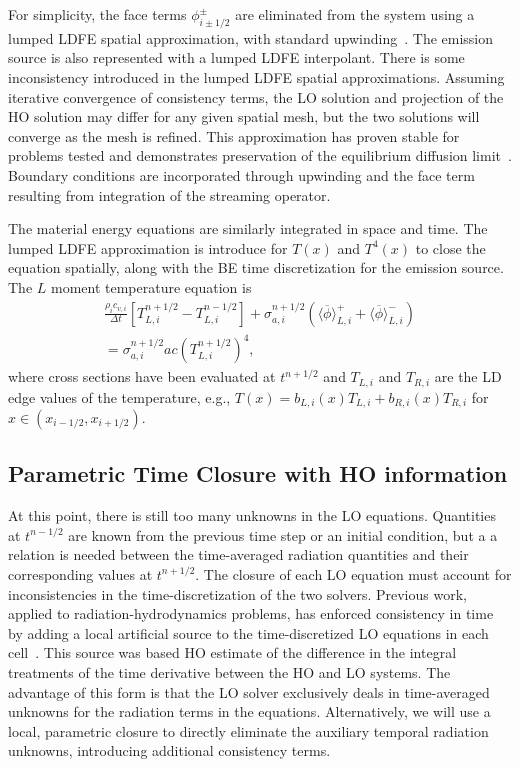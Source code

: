 \documentclass{anstrans}
\newcommand{\mom}[1]{\langle #1 \rangle}
\newcommand{\xl}{{x_{i-1/2}}}
\newcommand{\xr}{{x_{i+1/2}}}
\newcommand{\phibar}{\ensuremath{\overline{\phi}}}
\begin{document}
For simplicity, the face terms $\phi_{i\pm1/2}^\pm$ are eliminated from the
system using a lumped LDFE spatial approximation, with standard upwinding~\cite{bolding_nse}.  The
emission source is also represented with a lumped LDFE interpolant. 
There is some inconsistency introduced in the lumped LDFE spatial approximations. Assuming
iterative convergence of consistency terms, the LO solution and projection of the HO solution may
differ for any given spatial mesh, but the two solutions will converge as the mesh is refined.  This
approximation has proven stable for problems tested and demonstrates preservation of the equilibrium diffusion
limit~\cite{dissertation}. Boundary conditions are incorporated through upwinding and the face term
resulting from integration of the streaming operator.

The material energy equations are similarly integrated in space and time.  
The lumped LDFE approximation is introduce for $T(x)$ and $T^4(x)$ to close the equation spatially, along
with the BE time discretization for the emission source.  The $L$ moment temperature equation is 
\begin{multline}\label{eq:Tt_moml_ex}
     \frac{\rho_i c_{v,i}}{\Delta t}\left[T_{L,i}^{n+1/2} - T_{L,i}^{n-1/2}\right]   + \sigma_{a,i}^{n+1/2} \left( \mom{\phibar}_{L,i}^+ +
    \mom{\phibar}_{L,i}^- \right) \\ = \sigma_{a,i}^{n+1/2}a c
\left( T_{L,i}^{n+1/2}\right)^4,
\end{multline}
where cross sections have been evaluated at $t^{n+1/2}$ and $T_{L,i}$ and $T_{R,i}$ are the LD edge
values of the temperature, e.g., $T(x)=b_{L,i}(x)T_{L,i}+b_{R,i}(x)T_{R,i}$ for
$x\in(\xl,\xr)$.  

\subsection{Parametric Time Closure with HO information}

At this point, there is still too many unknowns in the LO equations. 
Quantities at $t^{n-1/2}$ are known from the previous time step or an initial condition, but a
a relation is needed between the time-averaged radiation quantities and their corresponding values at $t^{n+1/2}$.
The closure of each LO equation  must account for inconsistencies in the
time-discretization of the two solvers. 
Previous work, applied to radiation-hydrodynamics problems, has enforced
consistency in time by adding a local artificial source to the time-discretized LO
equations in each cell~\cite{holo_rh}.  This
source was based HO estimate of the difference in the integral treatments of the time
derivative between the HO and LO systems.  The advantage
of this form is that the LO solver exclusively deals in
time-averaged unknowns for the radiation terms in the equations. 
Alternatively, we will use a local, parametric closure to directly eliminate the auxiliary temporal
radiation unknowns, introducing additional consistency terms.
\end{document}
